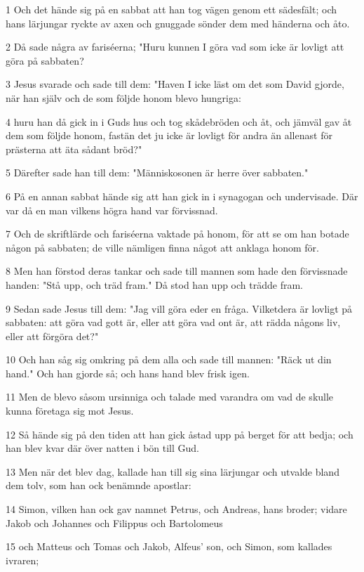 \par 1 Och det hände sig på en sabbat att han tog vägen genom ett sädesfält; och hans lärjungar ryckte av axen och gnuggade sönder dem med händerna och åto.
\par 2 Då sade några av fariséerna; "Huru kunnen I göra vad som icke är lovligt att göra på sabbaten?
\par 3 Jesus svarade och sade till dem: "Haven I icke läst om det som David gjorde, när han själv och de som följde honom blevo hungriga:
\par 4 huru han då gick in i Guds hus och tog skådebröden och åt, och jämväl gav åt dem som följde honom, fastän det ju icke är lovligt för andra än allenast för prästerna att äta sådant bröd?"
\par 5 Därefter sade han till dem: "Människosonen är herre över sabbaten."
\par 6 På en annan sabbat hände sig att han gick in i synagogan och undervisade. Där var då en man vilkens högra hand var förvissnad.
\par 7 Och de skriftlärde och fariséerna vaktade på honom, för att se om han botade någon på sabbaten; de ville nämligen finna något att anklaga honom för.
\par 8 Men han förstod deras tankar och sade till mannen som hade den förvissnade handen: "Stå upp, och träd fram." Då stod han upp och trädde fram.
\par 9 Sedan sade Jesus till dem: "Jag vill göra eder en fråga. Vilketdera är lovligt på sabbaten: att göra vad gott är, eller att göra vad ont är, att rädda någons liv, eller att förgöra det?"
\par 10 Och han såg sig omkring på dem alla och sade till mannen: "Räck ut din hand." Och han gjorde så; och hans hand blev frisk igen.
\par 11 Men de blevo såsom ursinniga och talade med varandra om vad de skulle kunna företaga sig mot Jesus.
\par 12 Så hände sig på den tiden att han gick åstad upp på berget för att bedja; och han blev kvar där över natten i bön till Gud.
\par 13 Men när det blev dag, kallade han till sig sina lärjungar och utvalde bland dem tolv, som han ock benämnde apostlar:
\par 14 Simon, vilken han ock gav namnet Petrus, och Andreas, hans broder; vidare Jakob och Johannes och Filippus och Bartolomeus
\par 15 och Matteus och Tomas och Jakob, Alfeus' son, och Simon, som kallades ivraren;
